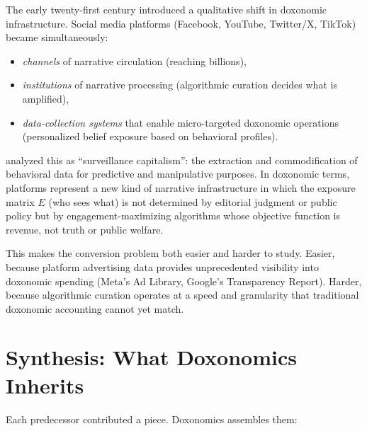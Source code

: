 The early twenty-first century introduced a qualitative shift in doxonomic infrastructure.
Social media platforms (Facebook, YouTube, Twitter/X, TikTok) became simultaneously:
\begin{itemize}[nosep]
  \item \emph{channels} of narrative circulation (reaching billions),
  \item \emph{institutions} of narrative processing (algorithmic curation decides what is amplified),
  \item \emph{data-collection systems} that enable micro-targeted doxonomic operations (personalized belief exposure based on behavioral profiles).
\end{itemize}

\textcite{zuboff2019} analyzed this as ``surveillance capitalism'': the extraction and commodification of behavioral data for predictive and manipulative purposes.
In doxonomic terms, platforms represent a new kind of narrative infrastructure in which the exposure matrix $E$ (who sees what) is not determined by editorial judgment or public policy but by engagement-maximizing algorithms whose objective function is revenue, not truth or public welfare.

This makes the conversion problem both easier and harder to study.
Easier, because platform advertising data provides unprecedented visibility into doxonomic spending (Meta's Ad Library, Google's Transparency Report).
Harder, because algorithmic curation operates at a speed and granularity that traditional doxonomic accounting cannot yet match.


\section{Synthesis: What Doxonomics Inherits}
\label{sec:ch3-synthesis}

Each predecessor contributed a piece.
Doxonomics assembles them:

